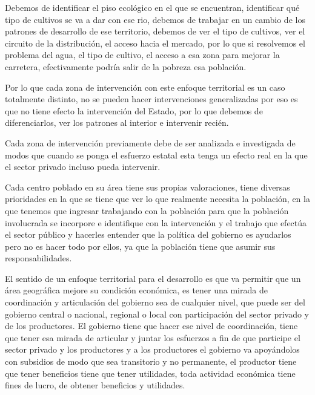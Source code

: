 \documentclass[
  letterpaper,
  DIV=11,
  numbers=noendperiod]{scrartcl}
\begin{document}
Debemos de identificar el piso ecológico en el que se encuentran,
identificar qué tipo de cultivos se va a dar con ese rio, debemos de
trabajar en un cambio de los patrones de desarrollo de ese territorio,
debemos de ver el tipo de cultivos, ver el circuito de la distribución,
el acceso hacia el mercado, por lo que si resolvemos el problema del
agua, el tipo de cultivo, el acceso a esa zona para mejorar la
carretera, efectivamente podría salir de la pobreza esa población.

Por lo que cada zona de intervención con este enfoque territorial es un
caso totalmente distinto, no se pueden hacer intervenciones
generalizadas por eso es que no tiene efecto la intervención del Estado,
por lo que debemos de diferenciarlos, ver los patrones al interior e
intervenir recién.

Cada zona de intervención previamente debe de ser analizada e
investigada de modos que cuando se ponga el esfuerzo estatal esta tenga
un efecto real en la que el sector privado incluso pueda intervenir.

Cada centro poblado en su área tiene sus propias valoraciones, tiene
diversas prioridades en la que se tiene que ver lo que realmente
necesita la población, en la que tenemos que ingresar trabajando con la
población para que la población involucrada se incorpore e identifique
con la intervención y el trabajo que efectúa el sector público y
hacerles entender que la política del gobierno es ayudarlos pero no es
hacer todo por ellos, ya que la población tiene que asumir sus
responsabilidades.

El sentido de un enfoque territorial para el desarrollo es que va
permitir que un área geográfica mejore su condición económica, es tener
una mirada de coordinación y articulación del gobierno sea de cualquier
nivel, que puede ser del gobierno central o nacional, regional o local
con participación del sector privado y de los productores. El gobierno
tiene que hacer ese nivel de coordinación, tiene que tener esa mirada de
articular y juntar los esfuerzos a fin de que participe el sector
privado y los productores y a los productores el gobierno va apoyándolos
con subsidios de modo que sea transitorio y no permanente, el productor
tiene que tener beneficios tiene que tener utilidades, toda actividad
económica tiene fines de lucro, de obtener beneficios y utilidades.
\end{document}
